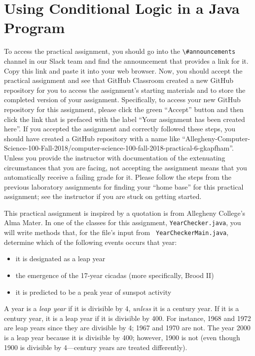 \documentclass[11pt]{article}
\newcommand{\channel}[1]{\lstinline{#1}}
\begin{document}
\section*{Using Conditional Logic in a Java Program}

To access the practical assignment, you should go into the \channel{\#announcements} channel in our Slack team and find
the announcement that provides a link for it. Copy this link and paste it into your web browser. Now, you should accept
the practical assignment and see that GitHub Classroom created a new GitHub repository for you to access the
assignment's starting materials and to store the completed version of your assignment. Specifically, to access your new
GitHub repository for this assignment, please click the green ``Accept'' button and then click the link that is prefaced
with the label ``Your assignment has been created here''. If you accepted the assignment and correctly followed these
steps, you should have created a GitHub repository with a name like
``Allegheny-Computer-Science-100-Fall-2018/computer-science-100-fall-2018-practical-6-gkapfham''. Unless you provide the
instructor with documentation of the extenuating circumstances that you are facing, not accepting the assignment means
that you automatically receive a failing grade for it. Please follow the steps from the previous laboratory assignments
for finding your ``home base'' for this practical assignment; see the instructor if you are stuck on getting started.

This practical assignment is inspired by a quotation is from Allegheny College's Alma Mater. In one of the classes for
this assignment, {\tt YearChecker.java}, you will write methods that, for the file's input from {\tt
YearCheckerMain.java}, determine which of the following events occurs that year: \begin{itemize}

\item
it is designated as a leap year

\item
the emergence of the 17-year cicadas (more specifically, Brood II)

\item
it is predicted to be a peak year of sunspot activity

\end{itemize}

\noindent A year is a {\em leap year\/} if it is divisible by 4, {\em unless\/} it is a century year. If it is a century
year, it is a leap year if it is divisible by 400. For instance, 1968 and 1972 are leap years since they are divisible
by 4; 1967 and 1970 are not. The year 2000 is a leap year because it is divisible by 400; however, 1900 is not (even
though 1900 is divisible by 4---century years are treated differently).
\end{document}
